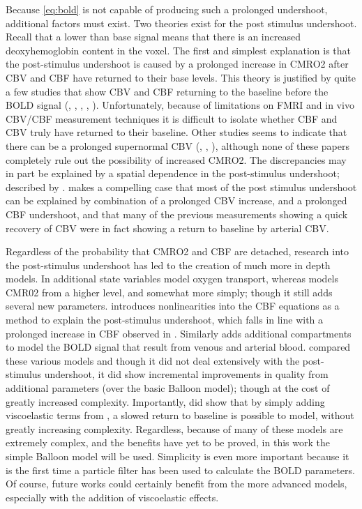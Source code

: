 Because \autoref{eq:bold} is not capable of producing such a prolonged undershoot,
additional factors must exist.  Two theories exist for the post stimulus undershoot.
Recall
that a lower than base signal means that there is an increased deoxyhemoglobin
content in the voxel. The first and simplest explanation is that the post-stimulus
undershoot is caused by a prolonged increase in CMRO2 after CBV and CBF
have returned to their base levels. This theory is justified by quite a few
studies that show CBV and CBF returning to the baseline before the BOLD signal
(\cite{Frahm2008}, \cite{Donahue2009}, \cite{Buxton2004}, \cite{Lu2004},
\cite{Shen2008}). Unfortunately, because of limitations on FMRI and in vivo
CBV/CBF measurement techniques it is difficult to isolate whether CBF and
CBV truly have returned to their baseline. Other studies seems to indicate
that there can be a prolonged supernormal CBV (\cite{Mandeville1999a}, 
\cite{Behzadi2005}, \cite{Chen2009a}), although none of these papers completely
rule out the possibility of increased CMRO2. The discrepancies may in part
be explained by a spatial dependence in the post-stimulus undershoot; described
by \cite{Yacoub2006}. \cite{Chen2009}
makes a compelling case that most of the post stimulus undershoot can be 
explained by combination of a prolonged CBV increase, and a prolonged CBF 
undershoot, and that
many of the previous measurements showing a quick recovery of CBV 
were in fact showing a return to baseline by arterial CBV.

Regardless of the probability that CMRO2 and CBF are detached,
research into the post-stimulus undershoot has led to the creation
of much more in depth models. In \cite{Zhen2002} additional state
variables model oxygen transport, whereas \cite{Buxton2004} models
CMR02 from a higher level, and somewhat more simply; though it 
still adds several new parameters. \cite{Behzadi2005}
introduces nonlinearities into the CBF equations as a method to
explain the post-stimulus undershoot, which falls in line with a 
prolonged increase in CBF observed in \cite{Chen2009}. Similarly
\cite{Zheng2005} adds additional compartments to model the BOLD signal
that result from venous and arterial blood. 
\cite{Deneux2006} compared these various models and though it did 
not deal extensively with the 
post-stimulus undershoot, it did show incremental improvements
in quality from additional parameters (over the basic Balloon model);
though at the cost of greatly increased complexity.
Importantly,\cite{Deneux2006} did show that by 
simply adding viscoelastic terms from \cite{Buxton2004}, a slowed return 
to baseline is possible to model, without greatly increasing
complexity. Regardless, because of many of these models are extremely
complex, and the benefits have yet to be proved, in this work the simple
Balloon model will be used. Simplicity is even more important because
it is the first time a particle filter has been used to calculate the
BOLD parameters. Of course, future works could certainly benefit from
the more advanced models, especially with the addition of viscoelastic
effects.


